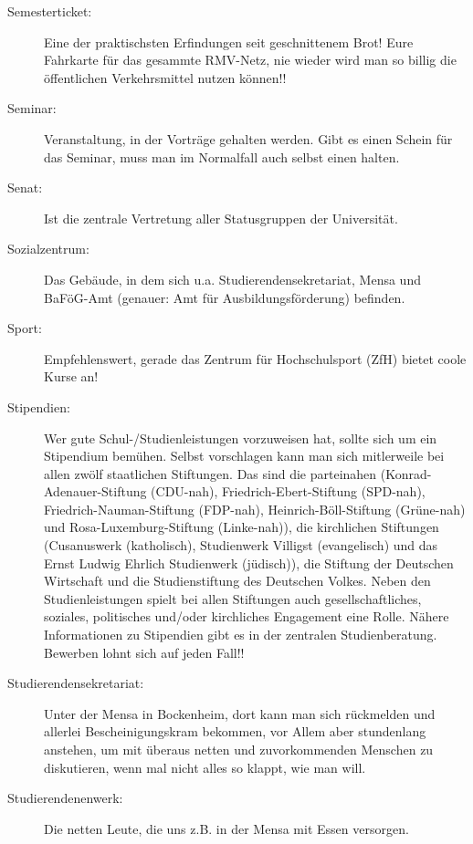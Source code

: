 \begin{description}
    \item[Semesterticket:]Eine der praktischsten Erfindungen
seit geschnittenem Brot! Eure Fahrkarte für das gesammte RMV-Netz,
nie wieder wird man so billig die öffentlichen Verkehrsmittel
nutzen können!!

    \item[Seminar:]Veranstaltung, in der
Vorträge gehalten werden. Gibt es einen Schein für das Seminar,
muss man im Normalfall auch selbst einen halten.

    \item[Senat:]Ist die zentrale Vertretung aller Statusgruppen der Universität.

    \item[Sozialzentrum:]Das Gebäude, in dem sich u.a. Studierendensekretariat, Mensa und
BaFöG-Amt (genauer: Amt für Ausbildungsförderung) befinden.

    \item[Sport:]Empfehlenswert, gerade das Zentrum für Hochschulsport (ZfH) bietet coole Kurse an!

    \item[Stipendien:]Wer gute Schul-/Studienleistungen vorzuweisen hat,
sollte sich um ein Stipendium bemühen.
Selbst vorschlagen kann man sich mitlerweile bei allen zwölf staatlichen Stiftungen.
Das sind die parteinahen (Konrad-Adenauer-Stiftung
(CDU-nah), Friedrich-Ebert-Stiftung (SPD-nah),
Friedrich-Nauman-Stiftung (FDP-nah), Heinrich-Böll-Stiftung
(Grüne-nah) und Rosa-Luxemburg-Stiftung (Linke-nah)),
die kirchlichen Stiftungen (Cusanuswerk (katholisch), Studienwerk Villigst (evangelisch)
und das Ernst Ludwig Ehrlich Studienwerk (jüdisch)),
die Stiftung der Deutschen Wirtschaft und die Studienstiftung des Deutschen Volkes.
Neben den Studienleistungen spielt bei allen Stiftungen auch
gesellschaftliches, soziales, politisches und/oder kirchliches
Engagement eine Rolle.
Nähere Informationen zu Stipendien gibt es in der zentralen Studienberatung.
Bewerben lohnt sich auf jeden Fall!!

    \item[Studierendensekretariat:]Unter der Mensa in Bockenheim,
dort kann man sich rückmelden und allerlei Bescheinigungskram
bekommen, vor Allem aber stundenlang anstehen, um mit überaus netten und zuvorkommenden
Menschen zu diskutieren, wenn mal nicht alles so klappt, wie man will.

    \item[Studierendenenwerk:] Die netten Leute, die uns z.B. in der Mensa
mit Essen versorgen.


\end{description}
